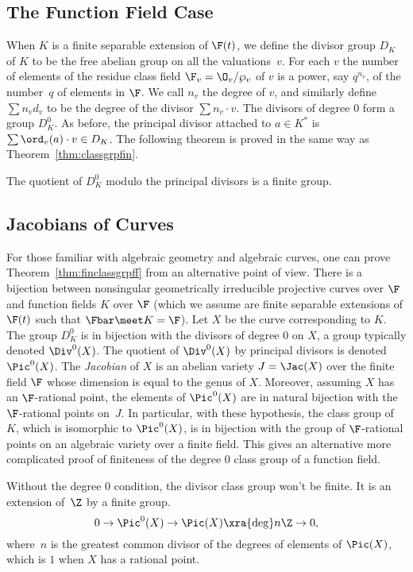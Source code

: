 \documentclass[11pt]{book}
\begin{document}
\begin{ch}
\subsection{The Function Field Case}

When $K$ is a finite separable extension of $\F(t)$, we define the
divisor group $D_K$ of $K$ to be the free abelian group on all the
valuations~$v$.  For each $v$ the number of elements of the residue class
field $\F_v = \O_v/\wp_v$ of $v$ is a power, say $q^{n_v}$, of the number~$q$
of elements in $\F$.  We call $n_v$ the degree of $v$, and similarly
define $\sum n_v d_v$ to be the degree of the divisor $\sum n_v\cdot v$.
The divisors of degree $0$ form a group $D_K^0$.
As before, the principal divisor attached to $a\in K^*$  is
$\sum \ord_v(a) \cdot v \in D_K$.
The following theorem is proved in the same way as Theorem~\ref{thm:classgrpfin}.
\begin{theorem}\label{thm:finclassgrpff}
The quotient of $D_K^0$ modulo the principal divisors is
a finite group.
\end{theorem}

\subsection{Jacobians of Curves}
For those familiar with algebraic geometry and algebraic curves, one
can prove Theorem~\ref{thm:finclassgrpff} from an alternative point of
view.  There is a bijection between nonsingular geometrically
irreducible projective curves over $\F$ and function fields $K$ over
$\F$ (which we assume are finite separable extensions of $\F(t)$ such
that $\Fbar\meet K = \F$).  Let $X$ be the curve corresponding to $K$.
The group $D_K^0$ is in bijection with the divisors of degree $0$ on
$X$, a group typically denoted $\Div^0(X)$.  The quotient of
$\Div^0(X)$ by principal divisors is denoted $\Pic^0(X)$.  The {\em
  Jacobian} of $X$ is an abelian variety $J=\Jac(X)$ over the finite
field $\F$ whose dimension is equal to the genus of $X$.  Moreover,
assuming $X$ has an $\F$-rational point, the elements of $\Pic^0(X)$
are in natural bijection with the $\F$-rational points on~$J$.  In
particular, with these hypothesis, the class group of $K$, which is
isomorphic to $\Pic^0(X)$, is in bijection with the group of
$\F$-rational points on an algebraic variety over a finite field.
This gives an alternative more complicated proof of finiteness of the
degree $0$ class group of a function field.

Without the degree $0$ condition, the divisor class group won't be finite.  It
is an extension of~$\Z$ by a finite group.
$$
  0 \to \Pic^0(X) \to \Pic(X) \xra{\deg} n\Z \to 0,
$$
where~$n$ is the greatest common divisor of the degrees of
elements of $\Pic(X)$, which is $1$ when $X$ has a rational
point.
\end{ch}
\end{document}
